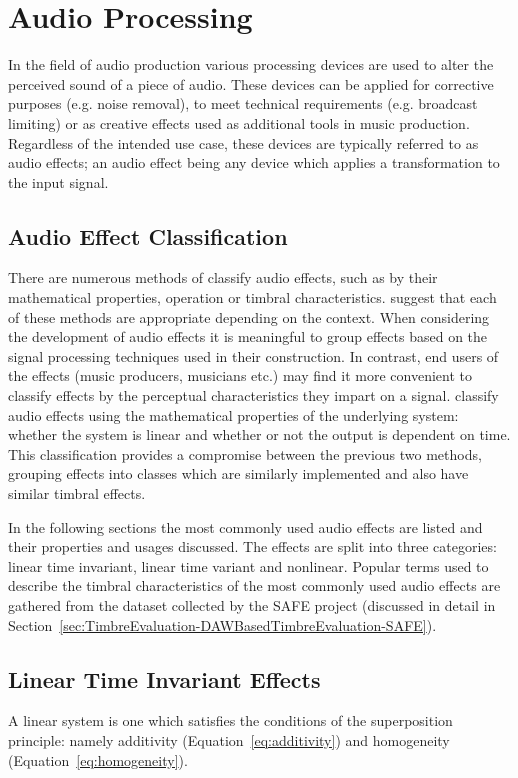 \section{Audio Processing}
\label{sec:Timbre-AudioProcessing}
	In the field of audio production various processing devices are used to alter the perceived sound of a piece of
	audio. These devices can be applied for corrective purposes (e.g. noise removal), to meet technical requirements
	(e.g. broadcast limiting) or as creative effects used as additional tools in music production. Regardless of the
	intended use case, these devices are typically referred to as audio effects; an audio effect being any device which
	applies a transformation to the input signal.
	
	\subsection{Audio Effect Classification}
	\label{sec:Timbre-AudioProcessing-Classification}
		There are numerous methods of classify audio effects, such as by their mathematical properties, operation
		or timbral characteristics. \citet{verfaille2006an} suggest that each of these methods are appropriate
		depending on the context. When considering the development of audio effects it is meaningful to group
		effects based on the signal processing techniques used in their construction. In contrast, end users of the
		effects (music producers, musicians etc.) may find it more convenient to classify effects by the perceptual
		characteristics they impart on a signal. \citet{eichas2015feature} classify audio effects using the
		mathematical properties of the underlying system: whether the system is linear and whether or not the
		output is dependent on time. This classification provides a compromise between the previous two methods,
		grouping effects into classes which are similarly implemented and also have similar timbral effects.
		
		In the following sections the most commonly used audio effects are listed and their properties and usages
		discussed. The effects are split into three categories: linear time invariant, linear time variant and
		nonlinear. Popular terms used to describe the timbral characteristics of the most commonly used audio
		effects are gathered from the dataset collected by the SAFE project (discussed in detail in
		Section~\ref{sec:TimbreEvaluation-DAWBasedTimbreEvaluation-SAFE}).

	\subsection{Linear Time Invariant Effects}
	\label{sec:Timbre-AudioProcessing-LTI}
		A linear system is one which satisfies the conditions of the superposition principle: namely additivity
		(Equation~\ref{eq:additivity}) and homogeneity (Equation~\ref{eq:homogeneity}).

